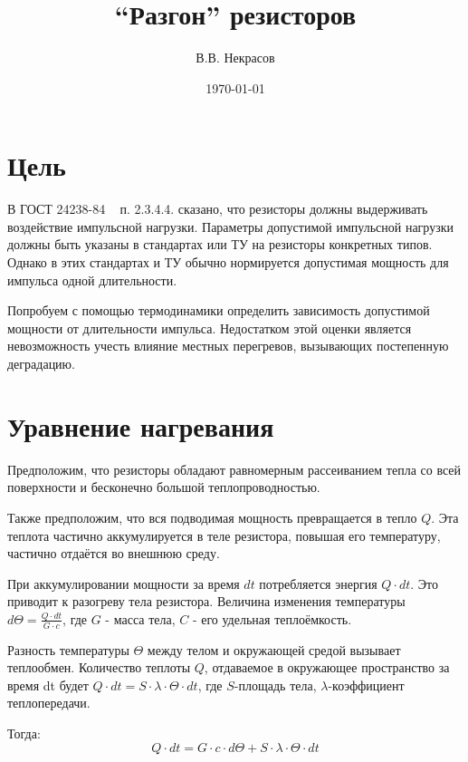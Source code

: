 \documentclass[a4paper]{article}
\begin{document}
\title{``Разгон'' резисторов}
\author{В.В. Некрасов}
\date{\today}
\maketitle

\section{Цель}

    В ГОСТ 24238-84 ~\cite{gost24238-84} п. 2.3.4.4. сказано, что резисторы должны выдерживать воздействие импульсной нагрузки. Параметры
допустимой импульсной нагрузки должны быть указаны в стандартах или ТУ на резисторы конкретных типов. Однако
в этих стандартах и ТУ обычно нормируется допустимая мощность для импульса одной длительности.

	Попробуем с помощью термодинамики определить зависимость допустимой мощности от длительности импульса.
Недостатком этой оценки является невозможность учесть влияние местных перегревов, вызывающих постепенную
деградацию.

\section{Уравнение нагревания}

    Предположим, что резисторы обладают равномерным рассеиванием тепла со всей поверхности и бесконечно
большой теплопроводностью.

    Также предположим, что вся подводимая мощность превращается в тепло $Q$. Эта теплота частично
аккумулируется в теле резистора, повышая его температуру, частично отдаётся во внешнюю среду.

    При аккумулировании мощности за время $dt$ потребляется энергия $Q{\cdot}dt$. Это приводит к разогреву
тела резистора. Величина изменения температуры $d{{\Theta}}=\frac{Q{\cdot}dt}{G{\cdot}c}$, где $G$ - масса
тела, $C$ - его удельная теплоёмкость.

    Разность температуры ${\Theta}$ между телом и окружающей средой вызывает теплообмен. Количество
теплоты $Q$, отдаваемое в окружающее пространство за время dt будет
$Q{\cdot}dt=S{\cdot}{\lambda}{\cdot}{\Theta}{\cdot}dt$, где $S$-площадь тела, ${\lambda}$-коэффициент
теплопередачи.

    Тогда:
\begin{equation}
\label{e_balance}
Q{\cdot}dt=G{\cdot}c{\cdot}d{\Theta}+S{\cdot}{\lambda}{\cdot}{\Theta}{\cdot}dt
\end{equation}
\end{document}

